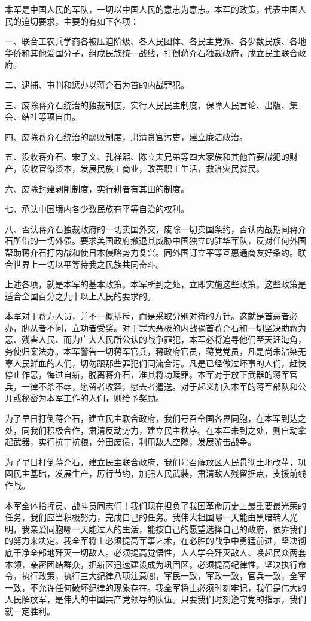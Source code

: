 \documentclass[UTF-8, a5paper, 12pt]{ctexart}
\begin{document}
本军是中国人民的军队，一切以中国人民的意志为意志。本军的政策，代表中国人民的迫切要求，主要的有如下各项：

一、联合工农兵学商各被压迫阶级、各人民团体、各民主党派、各少数民族、各地华侨和其他爱国分子，组成民族统一战线，打倒蒋介石独裁政府，成立民主联合政府。

二、逮捕、审判和惩办以蒋介石为首的内战罪犯。

三、废除蒋介石统治的独裁制度，实行人民民主制度，保障人民言论、出版、集会、结社等项自由。

四、废除蒋介石统治的腐败制度，肃清贪官污吏，建立廉洁政治。

五、没收蒋介石、宋子文、孔祥熙、陈立夫兄弟等四大家族和其他首要战犯的财产，没收官僚资本，发展民族工商业，改善职工生活，救济灾民贫民。

六、废除封建剥削制度，实行耕者有其田的制度。

七、承认中国境内各少数民族有平等自治的权利。

八、否认蒋介石独裁政府的一切卖国外交，废除一切卖国条约，否认内战期间蒋介石所借的一切外债。要求美国政府撤退其威胁中国独立的驻华军队，反对任何外国帮助蒋介石打内战和使日本侵略势力复兴。同外国订立平等互惠通商友好条约。联合世界上一切以平等待我之民族共同奋斗。

上述各项，就是本军的基本政策。本军所到之处，立即实施这些政策。这些政策是适合全国百分之九十以上人民的要求的。

本军对于蒋方人员，并不一概排斥，而是采取分别对待的方针。这就是首恶者必办，胁从者不问，立功者受奖。对于罪大恶极的内战祸首蒋介石和一切坚决助蒋为恶、残害人民、而为广大人民所公认的战争罪犯，本军必将追寻他们至天涯海角，务使归案法办。本军警告一切蒋军官兵，蒋政府官员，蒋党党员，凡是尚未沾染无辜人民鲜血的人们，切勿跟那些罪犯们同流合污。凡是已经做过坏事的人们，赶快停止作恶，悔过自新，脱离蒋介石，准其将功赎罪。本军对于放下武器的蒋军官兵，一律不杀不辱，愿留者收容，愿去者遣送。对于起义加入本军的蒋军部队和公开或秘密为本军工作的人们，则给予奖励。

为了早日打倒蒋介石，建立民主联合政府，我们号召全国各界同胞，在本军到达之处，同我们积极合作，肃清反动势力，建立民主秩序。在本军未到之处，则自动拿起武器，实行抗丁抗粮，分田废债，利用敌人空隙，发展游击战争。

为了早日打倒蒋介石，建立民主联合政府，我们号召解放区人民贯彻土地改革，巩固民主基础，发展生产，厉行节约，加强人民武装，肃清敌人残留据点，支援前线作战。

本军全体指挥员、战斗员同志们！我们现在担负了我国革命历史上最重要最光荣的任务，我们应当积极努力，完成自己的任务。我伟大祖国哪一天能由黑暗转入光明，我亲爱同胞哪一天能过人的生活，能按自己的愿望选择自己的政府，依靠我们的努力来决定。我全军将士必须提高军事艺术，在必胜的战争中勇猛前进，坚决彻底干净全部地歼灭一切敌人。必须提高觉悟性，人人学会歼灭敌人、唤起民众两套本领，亲密团结群众，把新区迅速建设成为巩固区。必须提高纪律性，坚决执行命令，执行政策，执行三大纪律八项注意⑻，军民一致，军政一致，官兵一致，全军一致，不允许任何破坏纪律的现象存在。我全军将士必须时刻牢记，我们是伟大的人民解放军，是伟大的中国共产党领导的队伍。只要我们时刻遵守党的指示，我们就一定胜利。
\end{document}
